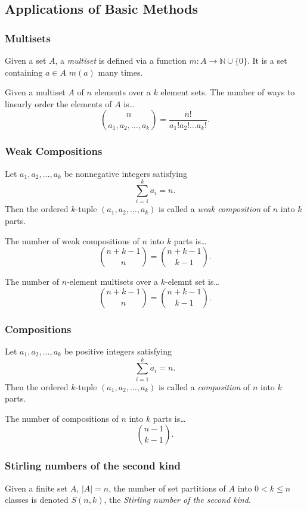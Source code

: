 \subsection{Applications of Basic Methods}\label{applicationsofbasicmethods}

\subsubsection{Multisets}\label{multisets}

Given a set $A$, a \emph{multiset} is defined via a function $m : A \rightarrow \mathbb{N} \cup \{ 0 \}$. It is a set containing $a \in A$ $m(a)$ many times.


\begin{theorem}
Given a multiset $A$ of $n$ elements over a $k$ element sets. The number of ways to linearly order the elements of $A$ is\dots
$${n \choose a_1,a_2,\dots,a_k} = \frac{n!}{a_1!a_2!\dots a_k!}.$$
\end{theorem}

\subsubsection{Weak Compositions}\label{weakcompositions}

Let $a_1,a_2,\dots,a_k$ be nonnegative integers satisfying
$$\sum^k_{i=1} a_i = n.$$
Then the ordered $k$-tuple $(a_1,a_2,\dots,a_k)$ is called a \emph{weak composition} of $n$ into $k$ parts.

\begin{theorem}
The number of weak compositions of $n$ into $k$ parts is\dots
$${n + k - 1 \choose n} = {n + k - 1 \choose k - 1}.$$
\end{theorem}

\begin{corollary}
The number of $n$-element multisets over a $k$-elemnt set is\dots
$${n + k - 1 \choose n} = {n + k - 1 \choose k - 1}.$$
\end{corollary}

\subsubsection{Compositions}\label{compositions}

Let $a_1,a_2,\dots,a_k$ be positive integers satisfying
$$\sum^k_{i=1} a_i = n.$$
Then the ordered $k$-tuple $(a_1,a_2,\dots,a_k)$ is called a \emph{composition} of $n$ into $k$ parts.

\begin{corollary}
The number of compositions of $n$ into $k$ parts is\dots
$${n - 1 \choose k - 1}.$$
\end{corollary}

\subsubsection{Stirling numbers of the second kind}\label{secondstirlingnumbers}

Given a finite set $A$, $|A| = n$, the number of set partitions of $A$ into $0 < k \leq n$ classes is denoted $S(n,k)$, the \emph{Stirling number of the second kind}.
